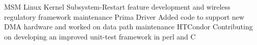 \begin{cvskills}
  \cvskill
    {MSM Linux Kernel}
    {Subsystem-Restart feature development and wireless regulatory framework maintenance}
  \cvskill
    {Prima Driver}
    {Added code to support new DMA hardware and worked on data path maintenance}
  \cvskill
    {HTCondor}
    {Contributing on developing an improved unit-test framework in perl and C}
\end{cvskills}

